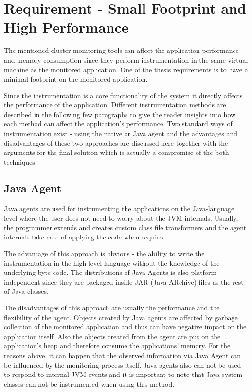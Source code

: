 \section{Requirement - Small Footprint and High Performance}
The mentioned cluster monitoring tools can affect the application performance and memory consumption since they perform instrumentation in the same virtual machine as the monitored application. One of the thesis requirements is to have  a minimal footprint on the monitored application.

Since the instrumentation is a core functionality of the system it directly affects the performance of the application. Different instrumentation methods are described in the following few paragraphs to give the reader insights into how each method can affect the application's performance. Two standard ways of instrumentation exist - using the native or Java agent and the advantages and disadvantages of these two approaches are discussed here together with the arguments for the final solution which is actually a compromise of the both techniques.
\subsection{Java Agent}
\label{java_agent}
Java agents are used for instrumenting the applications on the Java-language level where the user does not need to worry about the JVM internals. Usually, the programmer extends and creates custom class file transformers and the agent internals take care of applying the code when required. 

The advantage of this approach is obvious - the ability to write the instrumentation in the high-level language without the knowledge of the underlying byte code. The distributions of Java Agents is also platform independent since they are packaged inside JAR (Java ARchive) files as the rest of Java classes. 

The disadvantages of this approach are usually the performance and the flexibility of the agent. Objects created by Java agents are affected by garbage collection of the monitored application and thus can have negative impact on the application itself. Also the objects created from the agent are put on the application's heap and therefore consume the applications' memory. For the reasons above, it can happen that the observed information via Java Agent can be influenced by the monitoring process itself. Java agents also can not be used to respond to internal JVM events and it is important to note that Java system classes can not be instrumented when using this method.
